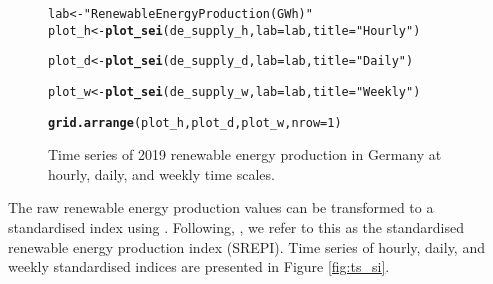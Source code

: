 \documentclass[article,shortnames,nojss]{jss}\usepackage[]{graphicx}\usepackage[]{xcolor}
\makeatletter
\newcommand{\hlnum}[1]{\textcolor[rgb]{0.686,0.059,0.569}{#1}}%
\newcommand{\hlstr}[1]{\textcolor[rgb]{0.192,0.494,0.8}{#1}}%
\newcommand{\hlstd}[1]{\textcolor[rgb]{0.345,0.345,0.345}{#1}}%
\newcommand{\hlkwb}[1]{\textcolor[rgb]{0.69,0.353,0.396}{#1}}%
\newcommand{\hlkwc}[1]{\textcolor[rgb]{0.333,0.667,0.333}{#1}}%
\newcommand{\hlkwd}[1]{\textcolor[rgb]{0.737,0.353,0.396}{\textbf{#1}}}%
\newenvironment{kframe}{%
 \def\at@end@of@kframe{}%
 \ifinner\ifhmode%
  \def\at@end@of@kframe{\end{minipage}}%
  \begin{minipage}{\columnwidth}%
 \fi\fi%
 \def\FrameCommand##1{\hskip\@totalleftmargin \hskip-\fboxsep
 \colorbox{shadecolor}{##1}\hskip-\fboxsep
     \hskip-\linewidth \hskip-\@totalleftmargin \hskip\columnwidth}%
 \MakeFramed {\advance\hsize-\width
   \@totalleftmargin\z@ \linewidth\hsize
   \@setminipage}}%
 {\par\unskip\endMakeFramed%
 \at@end@of@kframe}
\newenvironment{knitrout}{}{} %
\makeatother
\begin{document}
\begin{figure}
\begin{knitrout}
\color{fgcolor}\begin{kframe}
\begin{alltt}
\hlstd{lab} \hlkwb{<-} \hlstr{"Renewable Energy Production (GWh)"}
\hlstd{plot_h} \hlkwb{<-} \hlkwd{plot_sei}\hlstd{(de_supply_h,} \hlkwc{lab} \hlstd{= lab,} \hlkwc{title} \hlstd{=} \hlstr{"Hourly"}\hlstd{)}
\end{alltt}


{\ttfamily\noindent\bfseries{}}\begin{alltt}
\hlstd{plot_d} \hlkwb{<-} \hlkwd{plot_sei}\hlstd{(de_supply_d,} \hlkwc{lab} \hlstd{= lab,} \hlkwc{title} \hlstd{=} \hlstr{"Daily"}\hlstd{)}
\end{alltt}


{\ttfamily\noindent\bfseries{}}\begin{alltt}
\hlstd{plot_w} \hlkwb{<-} \hlkwd{plot_sei}\hlstd{(de_supply_w,} \hlkwc{lab} \hlstd{= lab,} \hlkwc{title} \hlstd{=} \hlstr{"Weekly"}\hlstd{)}
\end{alltt}


{\ttfamily\noindent\bfseries{}}\begin{alltt}
\hlkwd{grid.arrange}\hlstd{(plot_h, plot_d, plot_w,} \hlkwc{nrow} \hlstd{=} \hlnum{1}\hlstd{)}
\end{alltt}


{\ttfamily\noindent\bfseries\color{errorcolor}{\#\# Error in eval(expr, envir, enclos): object 'plot\_h' not found}}\end{kframe}
\end{knitrout}
\caption{Time series of 2019 renewable energy production in Germany at hourly, daily, and weekly time scales.}
\label{fig:ts_raw}
\end{figure}



The raw renewable energy production values can be transformed to a standardised index using . Following, \cite{AllenOtero2023}, we refer to this as the standardised renewable energy production index (SREPI). Time series of hourly, daily, and weekly standardised indices are presented in Figure \ref{fig:ts_si}.
\end{document}
